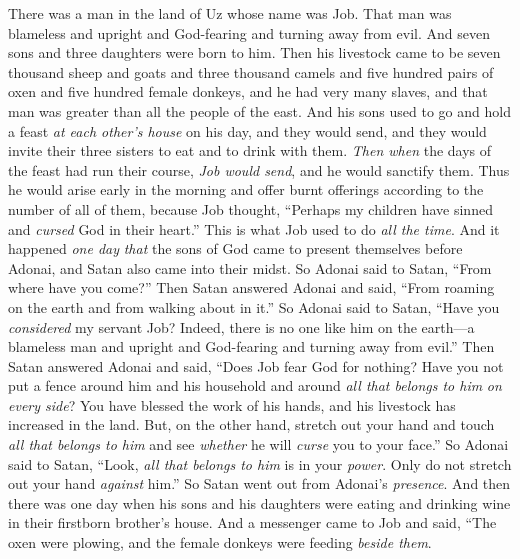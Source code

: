 
\begin{biblechapter} %
 There was a man in the land of Uz whose name was Job. That man was blameless and upright and God-fearing and turning away from evil.
\verse And seven sons and three daughters were born to him.
\verse Then his livestock came to be seven thousand sheep and goats and three thousand camels and five hundred pairs of oxen and five hundred female donkeys, and he had very many slaves, and that man was greater than all the people of the east.
\verse And his sons used to go and hold a feast \textit{at each other’s house} on his day, and they would send, and they would invite their three sisters to eat and to drink with them.
\verse \textit{Then when} the days of the feast had run their course, \textit{Job would send}, and he would sanctify them. Thus he would arise early in the morning and offer burnt offerings according to the number of all of them, because Job thought, “Perhaps my children have sinned and \textit{cursed} God in their heart.” This is what Job used to do \textit{all the time}.
\verse And it happened \textit{one day} \textit{that} the sons of God came to present themselves before Adonai, and Satan also came into their midst.
\verse So Adonai said to Satan, “From where have you come?” Then Satan answered Adonai and said, “From roaming on the earth and from walking about in it.”
\verse So Adonai said to Satan, “Have you \textit{considered} my servant Job? Indeed, there is no one like him on the earth—a blameless man and upright and God-fearing and turning away from evil.”
\verse Then Satan answered Adonai and said, “Does Job fear God for nothing?
\verse Have you not put a fence around him and his household and around \textit{all that belongs to him} \textit{on every side}? You have blessed the work of his hands, and his livestock has increased in the land.
\verse But, on the other hand, stretch out your hand and touch \textit{all that belongs to him} and see \textit{whether} he will \textit{curse} you to your face.”
\verse So Adonai said to Satan, “Look, \textit{all that belongs to him} is in your \textit{power}. Only do not stretch out your hand \textit{against} him.” So Satan went out from Adonai’s \textit{presence}.
 And then there was one day when his sons and his daughters were eating and drinking wine in their firstborn brother’s house.
\verse And a messenger came to Job and said, “The oxen were plowing, and the female donkeys were feeding \textit{beside them}.

\end{biblechapter}
